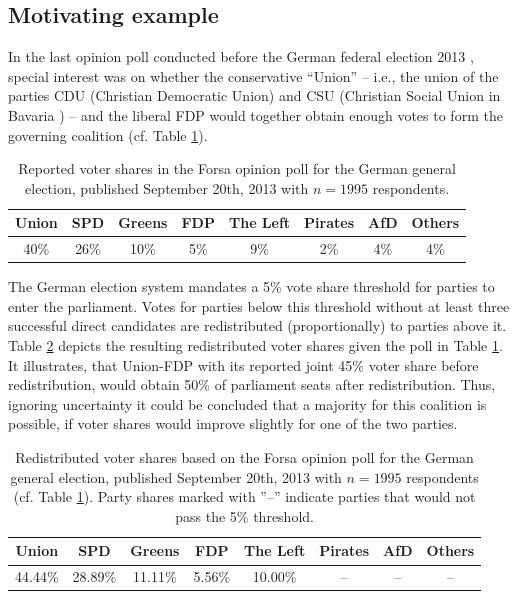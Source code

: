 \documentclass[smallcondensed]{svjour3}     %
\begin{document}
\subsection{Motivating example}\label{ssec:intro-ex-fdp}
In the last opinion poll conducted before the German federal election 2013 \citep{forsa_2013},
special interest was on whether the conservative ``Union'' -- i.e., the union of
the parties CDU (Christian Democratic Union) and CSU (Christian Social Union in Bavaria ) -- and the liberal FDP would together obtain enough votes to form the governing coalition (cf. Table \ref{tab_fdp}).

\begin{table}[!ht]\centering
\caption{Reported voter shares in the Forsa opinion poll for the German general
election, published September 20th, 2013 with $n=1995$ respondents.
\label{tab_fdp}
}
\medskip
\begin{tabular}{cccccccc}
\toprule[0.09 em]
Union & SPD & Greens & FDP & The Left & Pirates & AfD & Others \\
\midrule
40\% & 26\% & 10\% & 5\% & 9\% & 2\% & 4\% & 4\% \\
\bottomrule[0.09 em]
\end{tabular}
\end{table}

The German election system mandates a 5\% vote share threshold for parties to enter the parliament.
Votes for parties below this threshold without at least three successful direct candidates are redistributed (proportionally) to parties above it. Table \ref{tab_fdp_redist} depicts the resulting redistributed voter shares given the poll in Table \ref{tab_fdp}. It illustrates, that Union-FDP with
its reported joint 45\% voter share before redistribution, would obtain 50\% of parliament seats after redistribution. Thus, ignoring uncertainty it could be concluded that a majority for this coalition is possible, if voter shares would improve slightly for one of the two parties.

\begin{table}[!ht]\centering
\caption{Redistributed voter shares based on the Forsa opinion poll for the German general election,
published September 20th, 2013 with $n=1995$ respondents (cf. Table \ref{tab_fdp}).
Party shares marked with ''--'' indicate parties that would not pass the 5\% threshold.
\label{tab_fdp_redist}
}
\medskip
\begin{tabular}{cccccccc}
\toprule[0.09 em]
Union & SPD & Greens & FDP & The Left & Pirates & AfD & Others \\
\midrule
44.44\% & 28.89\% & 11.11\% & 5.56\% & 10.00\% & -- & -- & -- \\
\bottomrule[0.09 em]
\end{tabular}
\end{table}
\end{document}
